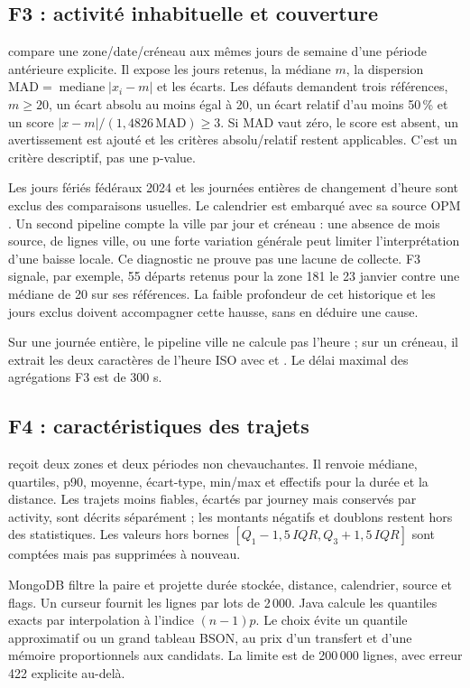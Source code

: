 \subsection{F3 : activité inhabituelle et couverture}
 compare une zone/date/créneau aux mêmes jours
de semaine d'une période antérieure explicite. Il expose les jours retenus,
la médiane $m$, la dispersion $\mathrm{MAD}=\operatorname{mediane}|x_i-m|$ et
les écarts. Les défauts demandent trois références, $m\geq20$, un écart absolu
au moins égal à 20, un écart relatif d'au moins 50\,\% et un score
$|x-m|/(1{,}4826\,\mathrm{MAD})\geq3$. Si MAD vaut zéro, le score est absent,
un avertissement est ajouté et les critères absolu/relatif restent applicables.
C'est un critère descriptif, pas une p-value.

Les jours fériés fédéraux 2024 et les journées entières de changement d'heure
sont exclus des comparaisons usuelles. Le calendrier est embarqué avec sa source
OPM \cite{calendrier}. Un second pipeline compte la ville par jour et créneau :
une absence de mois source, de lignes ville, ou une forte variation générale
peut limiter l'interprétation d'une baisse locale. Ce diagnostic ne prouve pas
une lacune de collecte. F3 signale, par exemple, 55 départs retenus
pour la zone 181 le 23 janvier contre une médiane de 20 sur ses références.
La faible profondeur de cet historique et les jours exclus doivent accompagner
cette hausse, sans en déduire une cause.

Sur une journée entière, le pipeline ville ne calcule pas l'heure ; sur un créneau, il extrait les deux caractères de l'heure ISO avec  et . Le délai maximal des agrégations F3 est de 300 s.

\subsection{F4 : caractéristiques des trajets}
 reçoit deux zones et deux périodes non chevauchantes.
Il renvoie médiane, quartiles, p90, moyenne, écart-type, min/max et effectifs pour
la durée et la distance. Les trajets moins fiables, écartés par journey mais conservés par activity, sont décrits séparément ; les
montants négatifs et doublons restent hors des statistiques. Les valeurs hors
bornes $[Q_1-1{,}5\,IQR,Q_3+1{,}5\,IQR]$ sont comptées mais pas supprimées à nouveau.

MongoDB filtre la paire et projette durée stockée, distance, calendrier, source
et flags. Un curseur fournit les lignes par lots de 2\,000. Java calcule les
quantiles exacts par interpolation à l'indice $(n-1)p$. Le choix évite un quantile
approximatif ou un grand tableau BSON, au prix d'un transfert et d'une mémoire
proportionnels aux candidats. La limite est de 200\,000 lignes, avec erreur 422
explicite au-delà.

